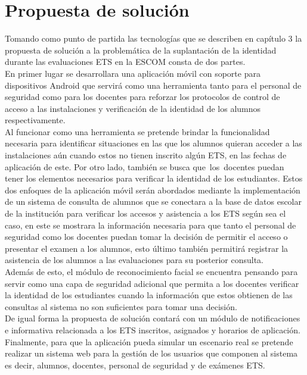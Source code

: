 
\section{Propuesta de solución}

Tomando como punto de partida las tecnologías que se describen en capítulo 3 la propuesta de solución a la problemática de la suplantación de la identidad durante las  evaluaciones ETS en la ESCOM consta de dos partes. \\

En primer lugar se desarrollara una aplicación móvil con soporte para dispositivos Android que servirá como una herramienta tanto para el personal de seguridad como para los docentes para reforzar los protocolos de control de acceso a las instalaciones y verificación de la identidad de los alumnos respectivamente. \\

Al funcionar como una herramienta se pretende brindar la funcionalidad necesaria para identificar situaciones en las que los alumnos quieran acceder a las instalaciones aún cuando estos no tienen inscrito algún ETS, en las fechas de aplicación de este.
Por otro lado, también se busca que los docentes puedan tener los elementos necesarios para verificar la identidad de los estudiantes.
Estos dos enfoques de la aplicación móvil serán abordados mediante la implementación de un sistema de consulta de alumnos que se conectara a la base de datos escolar de la institución para verificar los accesos y asistencia a los ETS según sea el caso, en este se mostrara la información necesaria para que tanto el personal de seguridad como los docentes puedan tomar la decisión de permitir el acceso o presentar el examen a los alumnos, esto último también permitirá registrar la asistencia de los alumnos a las evaluaciones para su posterior consulta.\\

Además de esto, el módulo de reconocimiento facial se encuentra pensando para servir como una capa de seguridad adicional que permita a los docentes verificar la identidad de los estudiantes cuando la información que estos obtienen de las consultas al sistema no son suficientes para tomar una decisión.\\

De igual forma la propuesta de solución contará con un módulo de notificaciones e informativa relacionada a los ETS inscritos, asignados y horarios de aplicación.\\

Finalmente, para que la aplicación pueda simular un escenario real se pretende realizar un sistema web para la gestión de los usuarios que componen al sistema es decir, alumnos, docentes, personal de seguridad y de exámenes ETS.






